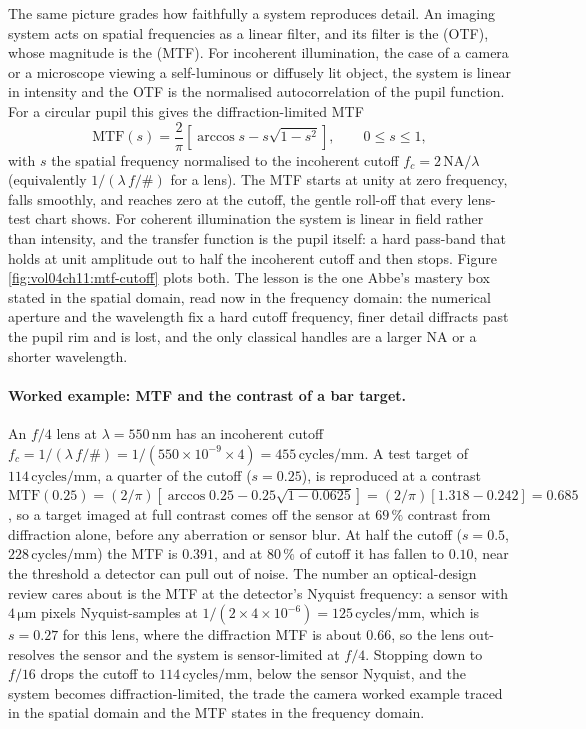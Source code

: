 The same picture grades how faithfully a system reproduces detail. An imaging
system acts on spatial frequencies as a linear filter, and its filter is the
 (OTF), whose magnitude is the
 (MTF). For incoherent illumination, the
case of a camera or a microscope viewing a self-luminous or diffusely lit
object, the system is linear in intensity and the OTF is the normalised
autocorrelation of the pupil function. For a circular pupil this gives the
diffraction-limited MTF
\[
\mathrm{MTF}(s) = \frac{2}{\pi}\left[\arccos s - s\sqrt{1 - s^2}\right],
\qquad 0 \le s \le 1,
\]
with $s$ the spatial frequency normalised to the incoherent cutoff
$f_c = 2\,\mathrm{NA}/\lambda$ (equivalently $1/(\lambda\,f/\#)$ for a lens). The
MTF starts at unity at zero frequency, falls smoothly, and reaches zero at the
cutoff, the gentle roll-off that every lens-test chart shows. For coherent
illumination the system is linear in field rather than intensity, and the
transfer function is the pupil itself: a hard pass-band that holds at unit
amplitude out to half the incoherent cutoff and then stops. Figure
\ref{fig:vol04ch11:mtf-cutoff} plots both. The lesson is the one Abbe's mastery
box stated in the spatial domain, read now in the frequency domain: the
numerical aperture and the wavelength fix a hard cutoff frequency, finer detail
diffracts past the pupil rim and is lost, and the only classical handles are a
larger NA or a shorter wavelength.



\paragraph{Worked example: MTF and the contrast of a bar target.} An
$f/4$ lens at $\lambda = 550\,\si{\nano\meter}$ has an incoherent cutoff
$f_c = 1/(\lambda\,f/\#) = 1/(550\times 10^{-9}\times 4) = 455\,\text{cycles}/
\si{\milli\meter}$. A test target of $114\,\text{cycles}/\si{\milli\meter}$,
a quarter of the cutoff ($s = 0.25$), is reproduced at a contrast
$\mathrm{MTF}(0.25) = (2/\pi)[\arccos 0.25 - 0.25\sqrt{1 - 0.0625}] =
(2/\pi)[1.318 - 0.242] = 0.685$, so a target imaged at full contrast comes off
the sensor at $69\,\%$ contrast from diffraction alone, before any aberration or
sensor blur. At half the cutoff ($s = 0.5$, $228\,\text{cycles}/\si{\milli
\meter}$) the MTF is $0.391$, and at $80\,\%$ of cutoff it has fallen to $0.10$,
near the threshold a detector can pull out of noise. The number an optical-design
review cares about is the MTF at the detector's Nyquist frequency: a sensor with
$4\,\si{\micro\meter}$ pixels Nyquist-samples at
$1/(2\times 4\times 10^{-6}) = 125\,\text{cycles}/\si{\milli\meter}$, which is
$s = 0.27$ for this lens, where the diffraction MTF is about $0.66$, so the lens
out-resolves the sensor and the system is sensor-limited at $f/4$. Stopping down
to $f/16$ drops the cutoff to $114\,\text{cycles}/\si{\milli\meter}$, below the
sensor Nyquist, and the system becomes diffraction-limited, the trade the camera
worked example traced in the spatial domain and the MTF states in the frequency
domain.


